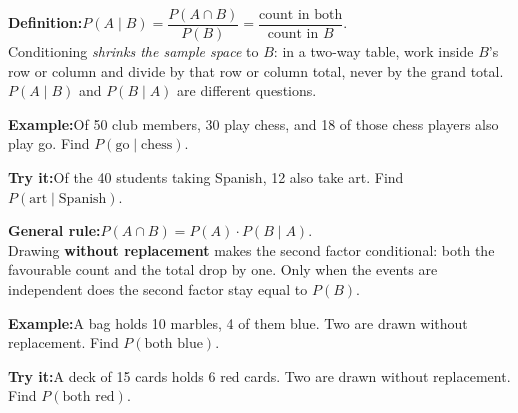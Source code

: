 \documentclass[12pt]{article}
\begin{document}

\begin{formulabox}\textbf{Definition:}\quad $P(A \mid B) = \dfrac{P(A \cap B)}{P(B)}
= \dfrac{\text{count in both}}{\text{count in } B}$.\\[4pt]
Conditioning \emph{shrinks the sample space} to $B$: in a two-way table, work inside
$B$'s row or column and divide by that row or column total, never by the grand total.
$P(A \mid B)$ and $P(B \mid A)$ are different questions.
\end{formulabox}
\begin{examplebox}\textbf{Example:}\quad Of 50 club members, 30 play chess, and 18 of
those chess players also play go. Find $P(\text{go} \mid \text{chess})$.
\end{examplebox}
\begin{tryitbox}\textbf{Try it:}\quad Of the 40 students taking Spanish, 12 also take art.
Find $P(\text{art} \mid \text{Spanish})$.\\[2pt]
\end{tryitbox}

\begin{formulabox}\textbf{General rule:}\quad $P(A \cap B) = P(A) \cdot P(B \mid A)$.\\[4pt]
Drawing \textbf{without replacement} makes the second factor conditional: both the
favourable count and the total drop by one. Only when the events are independent does the
second factor stay equal to $P(B)$.
\end{formulabox}
\begin{examplebox}\textbf{Example:}\quad A bag holds 10 marbles, 4 of them blue. Two are
drawn without replacement. Find $P(\text{both blue})$.
\end{examplebox}
\begin{tryitbox}\textbf{Try it:}\quad A deck of 15 cards holds 6 red cards. Two are drawn
without replacement. Find $P(\text{both red})$.\\[2pt]
\end{tryitbox}
\end{document}
